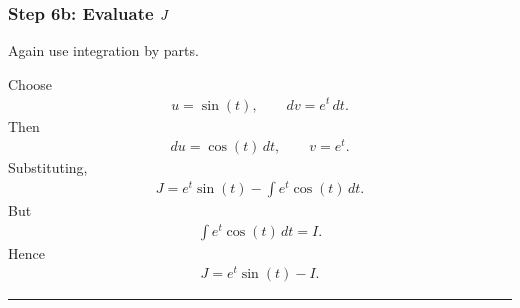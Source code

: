 \documentclass[letterpaper,10pt,english]{sphinxmanual}
\begin{document}
\subsubsection{Step 6b: Evaluate \protect\(J\protect\)}
\label{\detokenize{Language/Science_language/ODE_calculus/course_MATH_3035/homework_assignments/index_pdf:step-6b-evaluate-j}}
\sphinxAtStartPar
Again use integration by parts.

\sphinxAtStartPar
Choose
\begin{equation*}
\begin{split}u=\sin(t),
\qquad
dv=e^t\,dt.\end{split}
\end{equation*}
\sphinxAtStartPar
Then
\begin{equation*}
\begin{split}du=\cos(t)\,dt,
\qquad
v=e^t.\end{split}
\end{equation*}
\sphinxAtStartPar
Substituting,
\begin{equation*}
\begin{split}J=e^t\sin(t)-\int e^t\cos(t)\,dt.\end{split}
\end{equation*}
\sphinxAtStartPar
But
\begin{equation*}
\begin{split}\int e^t\cos(t)\,dt=I.\end{split}
\end{equation*}
\sphinxAtStartPar
Hence
\begin{equation*}
\begin{split}J=e^t\sin(t)-I.\end{split}
\end{equation*}

\bigskip\hrule\bigskip
\end{document}
